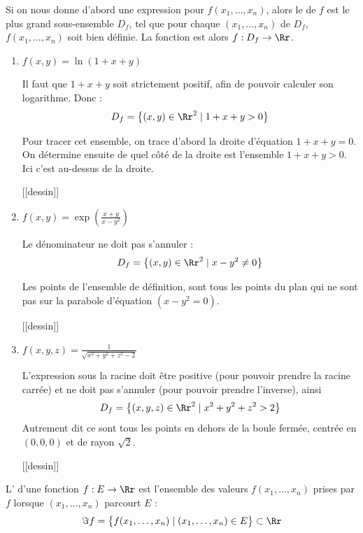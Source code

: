 \documentclass[12pt, class=report,crop=false]{standalone}
\begin{document}
\begin{definition}
Si on nous donne d'abord une expression pour $f(x_1,\ldots,x_n)$,  alors le  de $f$ est le plus grand sous-ensemble $D_f$, tel que pour chaque $(x_1,\ldots,x_n)$ de $D_f$, $f(x_1,\ldots,x_n)$ soit bien définie. La fonction est alors $f : D_f \to \Rr$.
\end{definition}


\begin{exemple}
\sauteligne
\begin{enumerate}
  \item $f(x,y) = \ln(1 + x + y)$

  Il faut que $1+x+y$ soit strictement positif, afin de pouvoir calculer son logarithme. Donc :
  $$D_f = \left\{ (x,y)\in \Rr^2 \mid 1+x+y >0 \right\}$$
  
  Pour tracer cet ensemble, on trace d'abord la droite  d'équation $1+x+y=0$. On détermine ensuite de quel côté de la droite est l'ensemble $1+x+y>0$. Ici c'est au-dessus de la droite.
  
  [[dessin]]
  
  \item $f(x,y) = \exp\left(\frac{x+y}{x-y^2}\right)$
  
  Le dénominateur ne doit pas s'annuler :  
  $$D_f = \left\{ (x,y)\in \Rr^2 \mid x-y^2 \neq 0 \right\}$$
  
  Les points de l'ensemble de définition, sont tous les points du plan qui ne sont pas sur la parabole d'équation $(x-y^2=0)$.
  
  [[dessin]]
    
  \item $f(x,y,z) = \frac {1}{\sqrt{x^2 + y^2 + z^2 - 2}}$
  
   L'expression sous la racine doit être positive (pour pouvoir prendre la racine carrée) et ne doit pas s'annuler (pour pouvoir prendre l'inverse), ainsi
  $$D_f = \left\{ (x,y,z)\in \Rr^2 \mid x^2+y^2+z^2 > 2 \right\}$$
  Autrement dit ce sont tous les points en dehors de la boule fermée, centrée en $(0,0,0)$ et de rayon $\sqrt 2$.
      
  [[dessin]]     
 
  
\end{enumerate}
\end{exemple}



\begin{definition}
L' d'une fonction $f : E \to \Rr$ est l'ensemble des valeurs $f(x_1,\ldots,x_n)$ prises par $f$ lorsque $(x_1,\ldots,x_n)$ parcourt $E$ :
$$\Im f = \big\{ f(x_1,\ldots,x_n) \mid (x_1,\ldots,x_n) \in E \big\} \subset \Rr$$
\end{definition}
\end{document}
